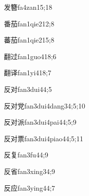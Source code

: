 \begin{verbete}{发簪}{fa4zan1}{5;18}
\end{verbete}

\begin{verbete}{番茄}{fan1qie2}{12;8}
\end{verbete}

\begin{verbete}{蕃茄}{fan1qie2}{15;8}
\end{verbete}

\begin{verbete}{翻过}{fan1guo4}{18;6}
\end{verbete}

\begin{verbete}{翻译}{fan1yi4}{18;7}
\end{verbete}

\begin{verbete}{反对}{fan3dui4}{4;5}
\end{verbete}

\begin{verbete}{反对党}{fan3dui4dang3}{4;5;10}
\end{verbete}

\begin{verbete}{反对派}{fan3dui4pai4}{4;5;9}
\end{verbete}

\begin{verbete}{反对票}{fan3dui4piao4}{4;5;11}
\end{verbete}

\begin{verbete}{反复}{fan3fu4}{4;9}
\end{verbete}

\begin{verbete}{反省}{fan3xing3}{4;9}
\end{verbete}

\begin{verbete}{反应}{fan3ying4}{4;7}
\end{verbete}

